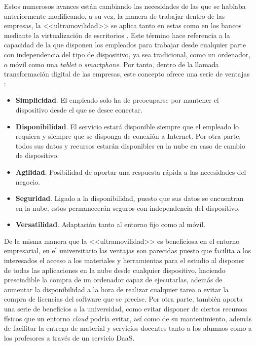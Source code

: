 \clearpage

Estos numerosos avances están cambiando las necesidades de las que se hablaba anteriormente modificando, a su vez, la manera de trabajar dentro de las empresas, la <<ultramovilidad>> se aplica tanto en estas como en los bancos mediante la virtualización de escritorios \cite{antena3noticias2019}. Este término hace referencia a la capacidad de la que disponen los empleados para trabajar desde cualquier parte con independencia del tipo de dispositivo, ya sea tradicional, como un ordenador, o móvil como una \textit{tablet} o \textit{smartphone}. Por tanto, dentro de la llamada transformación digital de las empresas, este concepto ofrece una serie de ventajas \cite{tecnologiaparatuempresa2019}:

\begin{itemize}
    \item \textbf{Simplicidad}. El empleado solo ha de preocuparse por mantener el dispositivo desde el que se desee conectar.
    \item \textbf{Disponibilidad}. El servicio estará disponible siempre que el empleado lo requiera y siempre que se disponga de conexión a Internet. Por otra parte, todos sus datos y recursos estarán disponibles en la nube en caso de cambio de dispositivo.
    \item \textbf{Agilidad}. Posibilidad de aportar una respuesta rápida a las necesidades del negocio.
    \item \textbf{Seguridad}. Ligado a la disponibilidad, puesto que sus datos se encuentran en la nube, estos permanecerán seguros con independencia del dispositivo.
    \item \textbf{Versatilidad}. Adaptación tanto al entorno fijo como al móvil.
\end{itemize}

De la misma manera que la <<ultramovilidad>> es beneficiosa en el entorno empresarial, en el universitario las ventajas son parecidas puesto que facilita a los interesados el acceso a los materiales y herramientas para el estudio al disponer de todas las aplicaciones en la nube desde cualquier dispositivo, haciendo prescindible la compra de un ordenador capaz de ejecutarlas, además de aumentar la disponibilidad a la hora de realizar cualquier tarea o evitar la compra de licencias del software que se precise. Por otra parte, también aporta una serie de beneficios a la universidad, como evitar disponer de ciertos recursos físicos que un entorno \textit{cloud} podría evitar, así como de su mantenimiento, además de facilitar la entrega de material y servicios docentes tanto a los alumnos como a los profesores a través de un servicio \acs{DaaS}.

